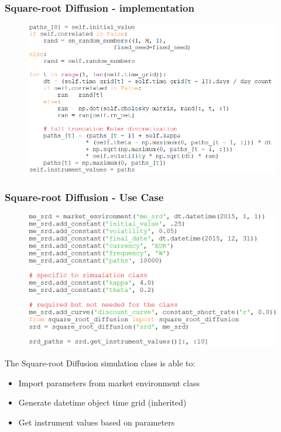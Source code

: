 \documentclass{beamer}
\begin{document}
\begin{frame}
\frametitle{Square-root Diffusion - implementation}
\begin{figure}[H]
	\includegraphics[scale=0.47]{srd_generate_path_2.png}
\end{figure}
\end{frame}

\begin{frame}
\frametitle{Square-root Diffusion - Use Case}
\begin{figure}[H]
	\includegraphics[scale=0.44]{srd_use_case.png}
\end{figure}
The Square-root Diffusion simulation class is able to:
\begin{itemize}
	\item Import parameters from market environment class
	\item Generate datetime object time grid (inherited)
	\item Get instrument values based on parameters
\end{itemize}
\end{frame}
\end{document}

